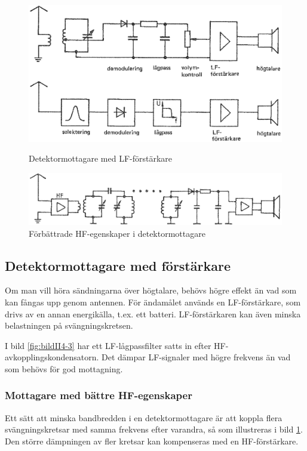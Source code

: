 \begin{figure}
  \includegraphics[width=\textwidth]{images/cropped_pdfs/bild_2_4-03.pdf}
  \caption{Detektormottagare med LF-förstärkare}
  \label{fig:bildII4-3}

  \includegraphics[width=\textwidth]{images/cropped_pdfs/bild_2_4-05.pdf}
  \caption{Förbättrade HF-egenskaper i detektormottagare}
  \label{fig:bildII4-5}
\end{figure}

\subsection{Detektormottagare med förstärkare}

Om man vill höra sändningarna över högtalare, behövs högre effekt än
vad som kan fångas upp genom antennen.
För ändamålet används en LF-förstärkare, som drivs av en annan energikälla,
t.ex. ett batteri.
LF-förstärkaren kan även minska belastningen på svängningskretsen.

I bild \ref{fig:bildII4-3} har ett LF-lågpassfilter satts in efter
HF-avkopplingskondensatorn.
Det dämpar LF-signaler med högre frekvens än vad som behövs för god mottagning.

\subsubsection{Mottagare med bättre HF-egenskaper}

Ett sätt att minska bandbredden i en detektormottagare är att koppla
flera svängningskretsar med samma frekvens efter varandra, så som illustreras
i bild \ref{fig:bildII4-5}.
Den större dämpningen av fler kretsar kan kompenseras med en HF-förstärkare.

